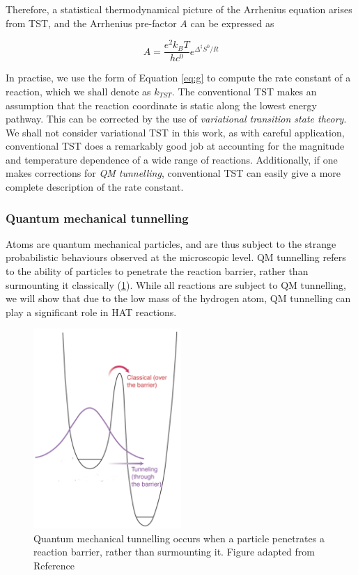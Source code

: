 Therefore, a statistical thermodynamical picture of the Arrhenius equation arises from TST, and the Arrhenius pre-factor $A$ can be expressed as

\begin{equation}
  A = \frac{e^2k_BT}{hc^0}e^{\Delta^\ddagger S^0/R}
\label{eq:afactor}
\end{equation}

In practise, we use the form of Equation \ref{eq:g} to compute the rate constant of a reaction, which we shall denote as $k_{TST}$. The conventional TST makes an assumption that the reaction coordinate is static along the lowest energy pathway. This can be corrected by the use of \emph{variational transition state theory}.\cite{Truhlar1984} We shall not consider variational TST in this work, as with careful application, conventional TST does a remarkably good job at accounting for the magnitude and temperature dependence of a wide range of reactions.\cite{Steinfeld1998} Additionally, if one makes corrections for \emph{QM tunnelling}, conventional TST can easily give a more complete description of the rate constant.

\subsubsection{Quantum mechanical tunnelling}

Atoms are quantum mechanical particles, and are thus subject to the strange probabilistic behaviours observed at the microscopic level. QM tunnelling refers to the ability of particles to penetrate the reaction barrier, rather than surmounting it classically (\ref{fig:tunnelling}). While all reactions are subject to QM tunnelling, we will show that due to the low mass of the hydrogen atom, QM tunnelling can play a significant role in HAT reactions.

\begin{figure}[htb]
  \centering
  \includegraphics[width=0.5\textwidth]{figures/tunnelling-1}
  \caption{Quantum mechanical tunnelling occurs when a particle penetrates a
    reaction barrier, rather than surmounting it. Figure adapted from Reference {\protect{}}}
  \label{fig:tunnelling}
\end{figure}


